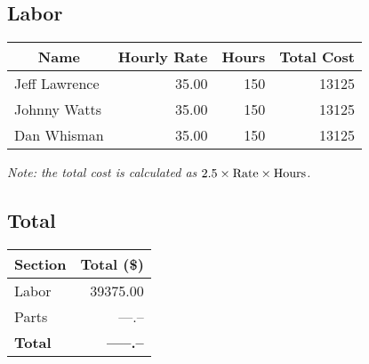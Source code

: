 \subsection{Labor}
\begin{center}
\begin{tabular}{|l|r|r||r|}
\hline
\multicolumn{1}{|c}{Name} & \multicolumn{1}{|c}{Hourly Rate} & \multicolumn{1}{|c||}{Hours} & \multicolumn{1}{c|}{Total Cost}\\
\hline\hline
Jeff Lawrence & 35.00 & 150 & 13125 \\
\hline
Johnny Watts  & 35.00 & 150 & 13125 \\
\hline
Dan Whisman   & 35.00 & 150 & 13125 \\
\hline
\end{tabular}

{\it Note: the total cost is calculated as $2.5\times {\rm Rate} \times {\rm Hours}$.}
\end{center}

\subsection{Total}
\begin{center}
\begin{tabular}{|l|r|}
\hline
\multicolumn{1}{|c}{Section} & \multicolumn{1}{|c|}{Total (\$)} \\
\hline\hline
Labor       & 39375.00 \\
\hline
Parts       & ---.--   \\
\hline
{\bf Total} & {\bf -----.--} \\
\hline
\end{tabular}
\end{center}

